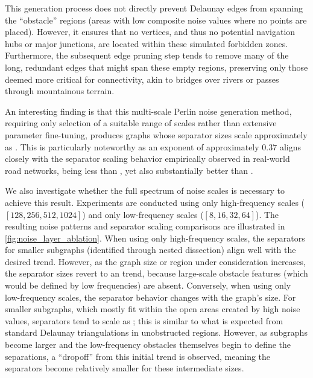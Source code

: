 This generation process does not directly prevent Delaunay edges from spanning the \enquote{obstacle} regions (areas with low composite noise values where no points are placed).
However, it ensures that no vertices, and thus no potential navigation hubs or major junctions, are located within these simulated forbidden zones.
Furthermore, the subsequent edge pruning step tends to remove many of the long, redundant edges that might span these empty regions, preserving only those deemed more critical for connectivity, akin to bridges over rivers or passes through mountainous terrain.

An interesting finding is that this multi-scale Perlin noise generation method, requiring only selection of a suitable range of scales rather than extensive parameter fine-tuning, produces graphs whose separator sizes scale approximately as .
This is particularly noteworthy as an exponent of approximately \(0.37\) aligns closely with the separator scaling behavior empirically observed in real-world road networks, being less than , yet also substantially better than .


We also investigate whether the full spectrum of noise scales is necessary to achieve this result.
Experiments are conducted using only high-frequency scales (\([128, 256, 512, 1024]\)) and only low-frequency scales (\([8, 16, 32, 64]\)).
The resulting noise patterns and separator scaling comparisons are illustrated in \cref{fig:noise_layer_ablation}.
When using only high-frequency scales, the separators for smaller subgraphs (identified through nested dissection) align well with the desired trend. However, as the graph size or region under consideration increases, the separator sizes revert to an  trend, because large-scale obstacle features (which would be defined by low frequencies) are absent.
Conversely, when using only low-frequency scales, the separator behavior changes with the graph's size.
For smaller subgraphs, which mostly fit within the open areas created by high noise values, separators tend to scale as ; this is similar to what is expected from standard Delaunay triangulations in unobstructed regions.
However, as subgraphs become larger and the low-frequency obstacles themselves begin to define the separations, a \enquote{dropoff} from this initial  trend is observed, meaning the separators become relatively smaller for these intermediate sizes.

